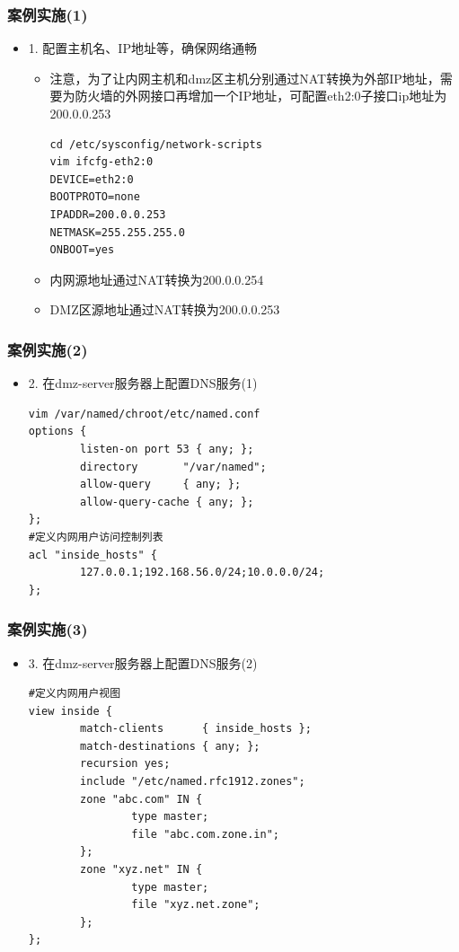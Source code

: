 \documentclass[xcolor=svgnames,presentation]{beamer}
\begin{document}
\begin{frame}[fragile]
\frametitle{案例实施(1)}
\label{sec-5-3}
\begin{itemize}

\item 1. 配置主机名、IP地址等，确保网络通畅
\label{sec-5-3-1}%
\begin{itemize}

\item 注意，为了让内网主机和dmz区主机分别通过NAT转换为外部IP地址，需要为防火墙的外网接口再增加一个IP地址，可配置eth2:0子接口ip地址为200.0.0.253\\
\label{sec-5-3-1-1}%
\begin{verbatim}
cd /etc/sysconfig/network-scripts
vim ifcfg-eth2:0
DEVICE=eth2:0
BOOTPROTO=none
IPADDR=200.0.0.253
NETMASK=255.255.255.0
ONBOOT=yes
\end{verbatim}

\item 内网源地址通过NAT转换为200.0.0.254
\label{sec-5-3-1-2}%

\item DMZ区源地址通过NAT转换为200.0.0.253
\label{sec-5-3-1-3}%
\end{itemize} %
\end{itemize} %
\end{frame}
\begin{frame}[fragile]
\frametitle{案例实施(2)}
\label{sec-5-4}
\begin{itemize}

\item 2. 在dmz-server服务器上配置DNS服务(1)\\
\label{sec-5-4-1}%
\begin{verbatim}
vim /var/named/chroot/etc/named.conf
options {
        listen-on port 53 { any; };
        directory       "/var/named";
        allow-query     { any; };
        allow-query-cache { any; };
};
#定义内网用户访问控制列表
acl "inside_hosts" {
        127.0.0.1;192.168.56.0/24;10.0.0.0/24;
};
\end{verbatim}
\end{itemize} %
\end{frame}
\begin{frame}[fragile]
\frametitle{案例实施(3)}
\label{sec-5-5}
\begin{itemize}

\item 3. 在dmz-server服务器上配置DNS服务(2)\\
\label{sec-5-5-1}%
\begin{verbatim}
#定义内网用户视图
view inside {
        match-clients      { inside_hosts };
        match-destinations { any; };
        recursion yes;
        include "/etc/named.rfc1912.zones";
        zone "abc.com" IN {
                type master;
                file "abc.com.zone.in";
        };
        zone "xyz.net" IN {
                type master;
                file "xyz.net.zone";
        };
};
\end{verbatim}
\end{itemize} %
\end{frame}
\end{document}
